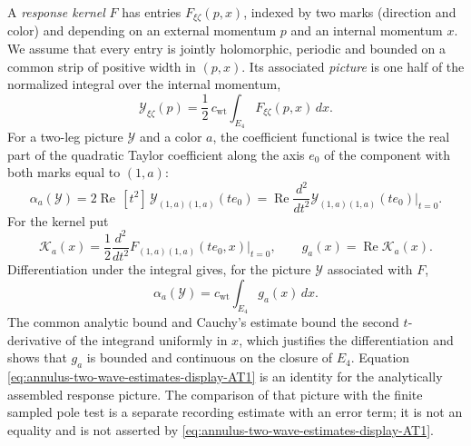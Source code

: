 A \emph{response kernel} $F$ has entries $F_{\xi\zeta}(p,x)$, indexed by
two marks (direction and color) and depending on an external momentum
$p$ and an internal momentum $x$. We assume that every entry is jointly
holomorphic, periodic and bounded on a common strip of positive width in
$(p,x)$. Its associated \emph{picture} is one half of the normalized
integral over the internal momentum,
\[
 \mathcal Y_{\xi\zeta}(p)=\frac12\,c_{\mathrm{wt}}\int_{E_4}
                         F_{\xi\zeta}(p,x)\,dx.
\]
For a two-leg picture $\mathcal Y$ and a color $a$, the coefficient
functional is twice the real part of the quadratic Taylor coefficient
along the axis $e_0$ of the component with both marks equal to
$(1,a)$:
\[
 \alpha_a(\mathcal Y)=2\operatorname{Re}\,[t^2]\,
                    \mathcal Y_{(1,a)(1,a)}(te_0)
 =\operatorname{Re}\frac{d^2}{dt^2}\mathcal Y_{(1,a)(1,a)}(te_0)
   \Big|_{t=0}.
\]
For the kernel put
\[
 \mathcal K_a(x)=\frac12\frac{d^2}{dt^2}F_{(1,a)(1,a)}(te_0,x)\Big|_{t=0},
 \qquad g_a(x)=\operatorname{Re}\mathcal K_a(x).
\]
Differentiation under the integral gives, for the picture $\mathcal Y$
associated with $F$,
\begin{equation}
 \alpha_a(\mathcal Y)=c_{\mathrm{wt}}\int_{E_4}g_a(x)\,dx.
 \label{eq:annulus-two-wave-estimates-display-AT1}
\end{equation}
The common analytic bound and Cauchy's estimate bound the second
$t$-derivative of the integrand uniformly in $x$, which justifies the
differentiation and shows that $g_a$ is bounded and continuous on the
closure of $E_4$. Equation \eqref{eq:annulus-two-wave-estimates-display-AT1} is an identity for the analytically
assembled response picture. The comparison of that picture with the
finite sampled pole test is a separate recording estimate with an
error term; it is not an equality and is not asserted by \eqref{eq:annulus-two-wave-estimates-display-AT1}.

